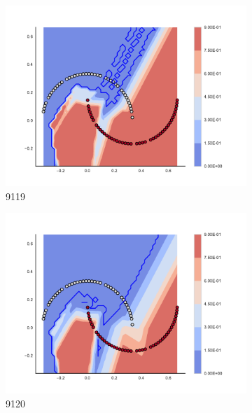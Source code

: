 \begin{figure}[h]
\begin{subfigure}[b]{0.09\textwidth}
    \includegraphics[clip, trim=2.35cm 1.75cm 4.5cm 0cm,width=\textwidth]{img/convergence/9119.pdf}
    \caption{9119}
    \label{fig:convergence_9119}
\end{subfigure}
%
\begin{subfigure}[b]{0.09\textwidth}
    \includegraphics[clip, trim=2.35cm 1.75cm 4.5cm 0cm,width=\textwidth]{img/convergence/9120.pdf}
    \caption{9120}
    \label{fig:convergence_9120}
\end{subfigure}
%
\begin{subfigure}[b]{0.09\textwidth}

\end{subfigure}
\end{figure}
